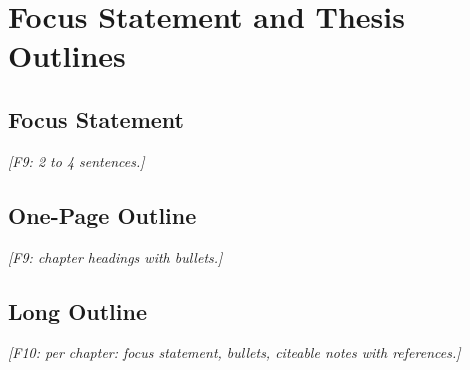 
\section{Focus Statement and Thesis Outlines}

\subsection{Focus Statement}
\textit{[F9: 2 to 4 sentences.]}

\subsection{One-Page Outline}
\textit{[F9: chapter headings with bullets.]}

\subsection{Long Outline}
\textit{[F10: per chapter: focus statement, bullets, citeable notes with references.]}
